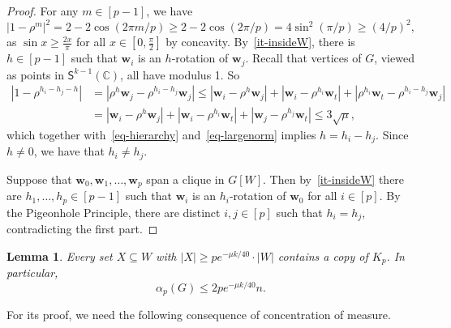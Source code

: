 \documentclass[11pt, a4paper]{article}
\newcommand{\V}[1]{\mathbold{#1}}
\newtheorem{lemma}[theorem]{Lemma}
\theoremstyle{definition}
\newcommand{\sS}{\mathsf{S}}
\newcommand{\sC}{\mathbb{C}}
\begin{document}
\begin{proof}
	For any $m \in [p-1]$, we have
	\begin{equation}\label{eq-largenorm}
		|1-\rho^m|^2 = 2-2\cos \left(2\pi m/p\right) \geq 2-2\cos\left(2\pi/p\right) = 4\sin^2 \left(\pi/p\right) \geq \left(4/p\right)^2,
	\end{equation}
	as $\sin x\ge \frac{2x}{\pi}$ for all $x\in[0,\frac{\pi}{2}]$ by concavity.
	By~\ref{it-insideW}, there is $h\in [p-1]$ such that $\V{w}_i$ is an $h$-rotation of $\V{w}_j$. Recall that vertices of $G$, viewed as points in $\sS^{k-1}(\sC)$, all have modulus 1.
	So
	\begin{align*}
		|1-\rho^{h_i-h_j-h}| &= |\rho^h\V{w}_j-\rho^{h_i-h_j}\V{w}_j| \leq |\V{w}_i-\rho^h\V{w}_j| + |\V{w}_i-\rho^{h_i}\V{w}_t| + |\rho^{h_i}\V{w}_t-\rho^{h_i-h_j}\V{w}_j|\\
		&= |\V{w}_i-\rho^h\V{w}_j| + |\V{w}_i-\rho^{h_i}\V{w}_t| + |\V{w}_j-\rho^{h_j}\V{w}_t| \leq 3\sqrt{\mu},
	\end{align*}
	which together with~\eqref{eq-hierarchy} and~\eqref{eq-largenorm} implies $h=h_i-h_j$. Since $h\neq 0$, we have that $h_i \neq h_j$.
	
	Suppose that $\V{w}_0,\V{w}_1,\ldots,\V{w}_{ p}$ span a clique in $G[W]$. Then by~\ref{it-insideW} there are $h_1,\ldots,h_ p \in [p-1]$ such that $\V{w}_i$ is an $h_i$-rotation of $\V{w}_0$ for all $i \in [ p]$.
	By the Pigeonhole Principle, there are distinct $i,j \in [ p]$ such that $h_i=h_j$, contradicting the first part.
\end{proof}

\begin{lemma}\label{lem-independenceGBEoneside}
	Every set $X\subseteq W$ with $|X|\ge pe^{-\mu k/40}\cdot|W|$ contains a copy of $K_p$. In particular, $$\alpha_p(G)\le 2pe^{-\mu k/40}n.$$
\end{lemma}

For its proof, we need the following consequence of concentration of measure.
\end{document}
